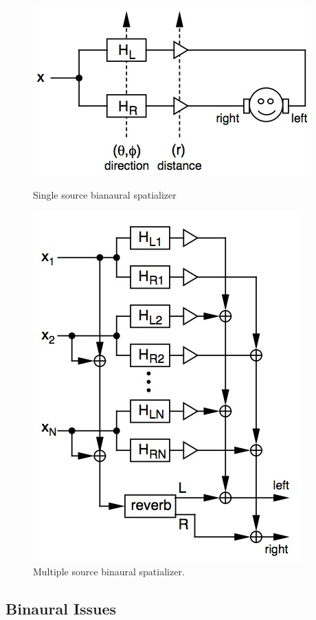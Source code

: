 \begin{figure}[htbp4]
  \begin{minipage}[b]{.45\linewidth}
    \centering
    \includegraphics[width=.8\linewidth]{images/binaural_spatializer.jpg}
    \caption{Single source bianaural spatializer}
    \label{fig:binaural_spatializer}
  \end{minipage}
  \hspace{0.5cm}
  \begin{minipage}[b]{0.5\linewidth}
    \centering
  \includegraphics[width=.5\linewidth]{images/binaural_spatializers.jpg}
    \caption{Multiple source binaural spatializer.}
    \label{fig:binaural_spatializers}
  \end{minipage}
\end{figure}




\subsection{                  Binaural Issues                                 }

